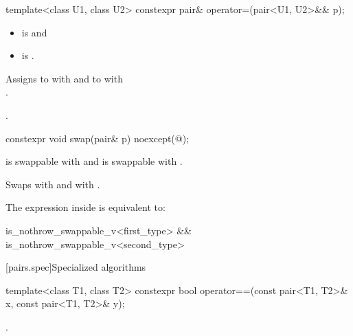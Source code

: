 %
\begin{itemdecl}
template<class U1, class U2> constexpr pair& operator=(pair<U1, U2>&& p);
\end{itemdecl}

\begin{itemdescr}
\pnum
\constraints
\begin{itemize}
\item {} is  and
\item {} is .
\end{itemize}

\pnum
\effects
Assigns to  with 
and to  with\\ .

\pnum
\returns
{}.
\end{itemdescr}

%
\begin{itemdecl}
constexpr void swap(pair& p) noexcept(@\seebelow@);
\end{itemdecl}

\begin{itemdescr}
\pnum
\expects
{} is swappable with  and
 is swappable with .

\pnum
\effects
Swaps
 with  and
 with .

\pnum
\remarks
The expression inside  is equivalent to:
\begin{codeblock}
is_nothrow_swappable_v<first_type> && is_nothrow_swappable_v<second_type>
\end{codeblock}
\end{itemdescr}

[pairs.spec]{Specialized algorithms}

%
\begin{itemdecl}
template<class T1, class T2>
  constexpr bool operator==(const pair<T1, T2>& x, const pair<T1, T2>& y);
\end{itemdecl}

\begin{itemdescr}
\pnum
\returns
{}.
\end{itemdescr}

